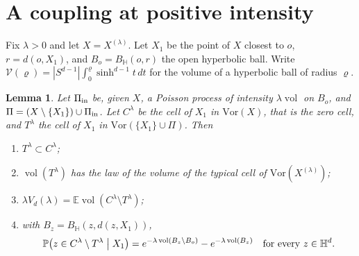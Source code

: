 \documentclass[11pt]{amsart}
\newtheorem{lemma}[theorem]{Lemma}
\theoremstyle{remark}
\newcommand{\HH}{\mathbb{H}}
\newcommand{\E}{\mathbb{E}}
\newcommand{\Prob}{\mathbb{P}}
\newcommand{\vol}{\operatorname{vol}}
\begin{document}
\section{A coupling at positive intensity}\label{sec:finite}

Fix $\lambda>0$ and let $X=X^{(\lambda)}$. Let $X_1$ be the point of $X$ closest to $o$, $r=d(o,X_1)$, and $B_o=
B_{\HH}(o,r)$ the open hyperbolic ball. Write $\mathcal V(\varrho)=|S^{d-1}|\int_0^\varrho\sinh^{d-1}t\,dt$ for the
volume of a hyperbolic ball of radius $\varrho$.

\begin{lemma}\label{lem:coupling}
Let $\Pi_{\rm in}$ be, given $X$, a Poisson process of intensity $\lambda\vol$ on $B_o$, and $\Pi=(X\setminus\{X_1\})\cup
\Pi_{\rm in}$. Let $C^\lambda$ be the cell of $X_1$ in $\mathrm{Vor}(X)$, that is the zero cell, and $T^\lambda$ the
cell of $X_1$ in $\mathrm{Vor}(\{X_1\}\cup\Pi)$. Then
\begin{enumerate}
\item $T^\lambda\subset C^\lambda$;
\item $\vol(T^\lambda)$ has the law of the volume of the typical cell of $\mathrm{Vor}(X^{(\lambda)})$;
\item $\lambda V_d(\lambda)=\E\vol(C^\lambda\setminus T^\lambda)$;
\item with $B_z=B_{\HH}(z,d(z,X_1))$,
\[
\Prob\bigl(z\in C^\lambda\setminus T^\lambda\bigm|X_1\bigr)=e^{-\lambda\vol(B_z\setminus B_o)}-e^{-\lambda\vol(B_z)}
\quad\text{for every }z\in\HH^d .
\]
\end{enumerate}
\end{lemma}
\end{document}
